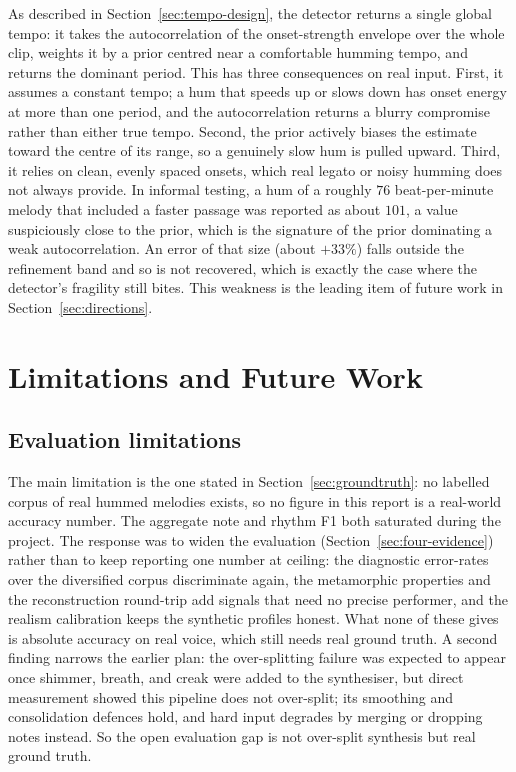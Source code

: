 \documentclass[12pt,a4paper]{article}
\begin{document}
As described in Section~\ref{sec:tempo-design}, the detector returns a single
global tempo: it takes the autocorrelation of the onset-strength envelope over
the whole clip, weights it by a prior centred near a comfortable humming tempo,
and returns the dominant period. This has three consequences on real input.
First, it assumes a constant tempo; a hum that speeds up or slows down has onset
energy at more than one period, and the autocorrelation returns a blurry
compromise rather than either true tempo. Second, the prior actively biases the
estimate toward the centre of its range, so a genuinely slow hum is pulled
upward. Third, it relies on clean, evenly spaced onsets, which real legato or
noisy humming does not always provide. In informal testing, a hum of a roughly
$76$ beat-per-minute melody that included a faster passage was reported as about
$101$, a value suspiciously close to the prior, which is the signature of the
prior dominating a weak autocorrelation. An error of that size (about $+33\%$)
falls outside the refinement band and so is not recovered, which is exactly the
case where the detector's fragility still bites. This weakness is the leading
item of future work in Section~\ref{sec:directions}.

\section{Limitations and Future Work}

\subsection{Evaluation limitations}
\label{sec:eval-limits}

The main limitation is the one stated in Section~\ref{sec:groundtruth}: no
labelled corpus of real hummed melodies exists, so no figure in this report is a
real-world accuracy number. The aggregate note and rhythm F1 both saturated
during the project. The response was to widen the evaluation
(Section~\ref{sec:four-evidence}) rather than to keep reporting one number at
ceiling: the diagnostic error-rates over the diversified corpus discriminate
again, the metamorphic properties and the reconstruction round-trip add signals
that need no precise performer, and the realism calibration keeps the synthetic
profiles honest. What none of these gives is absolute accuracy on real voice,
which still needs real ground truth. A second finding narrows the earlier plan:
the over-splitting failure was expected to appear once shimmer, breath, and creak
were added to the synthesiser, but direct measurement showed this pipeline does
not over-split; its smoothing and consolidation defences hold, and hard input
degrades by merging or dropping notes instead. So the open evaluation gap is not
over-split synthesis but real ground truth.
\end{document}
